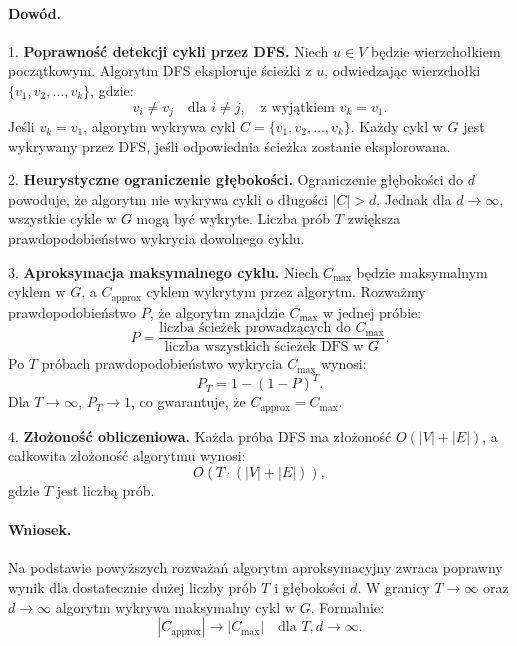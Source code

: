 \paragraph{Dowód.}
1. \textbf{Poprawność detekcji cykli przez DFS.}
   Niech \( u \in V \) będzie wierzchołkiem początkowym. Algorytm DFS eksploruje ścieżki z \( u \), odwiedzając wierzchołki \( \{v_1, v_2, \dots, v_k\} \), gdzie:
   \[
   v_i \neq v_j \quad \text{dla } i \neq j, \quad \text{z wyjątkiem } v_k = v_1.
   \]
   Jeśli \( v_k = v_1 \), algorytm wykrywa cykl \( C = \{v_1, v_2, \dots, v_k\} \). Każdy cykl w \( G \) jest wykrywany przez DFS, jeśli odpowiednia ścieżka zostanie eksplorowana.

2. \textbf{Heurystyczne ograniczenie głębokości.}
   Ograniczenie głębokości do \( d \) powoduje, że algorytm nie wykrywa cykli o długości \( |C| > d \). Jednak dla \( d \to \infty \), wszystkie cykle w \( G \) mogą być wykryte. Liczba prób \( T \) zwiększa prawdopodobieństwo wykrycia dowolnego cyklu.

3. \textbf{Aproksymacja maksymalnego cyklu.}
   Niech \( C_{\text{max}} \) będzie maksymalnym cyklem w \( G \), a \( C_{\text{approx}} \) cyklem wykrytym przez algorytm. Rozważmy prawdopodobieństwo \( P \), że algorytm znajdzie \( C_{\text{max}} \) w jednej próbie:
   \[
   P = \frac{\text{liczba ścieżek prowadzących do } C_{\text{max}}}{\text{liczba wszystkich ścieżek DFS w } G}.
   \]
   Po \( T \) próbach prawdopodobieństwo wykrycia \( C_{\text{max}} \) wynosi:
   \[
   P_T = 1 - (1 - P)^T.
   \]
   Dla \( T \to \infty \), \( P_T \to 1 \), co gwarantuje, że \( C_{\text{approx}} = C_{\text{max}} \).

4. \textbf{Złożoność obliczeniowa.}
   Każda próba DFS ma złożoność \( O(|V| + |E|) \), a całkowita złożoność algorytmu wynosi:
   \[
   O(T \cdot (|V| + |E|)),
   \]
   gdzie \( T \) jest liczbą prób.

\paragraph{Wniosek.}
Na podstawie powyższych rozważań algorytm aproksymacyjny zwraca poprawny wynik dla dostatecznie dużej liczby prób \( T \) i głębokości \( d \). W granicy \( T \to \infty \) oraz \( d \to \infty \) algorytm wykrywa maksymalny cykl w \( G \). Formalnie:
\[
|C_{\text{approx}}| \to |C_{\text{max}}| \quad \text{dla } T, d \to \infty.
\]

